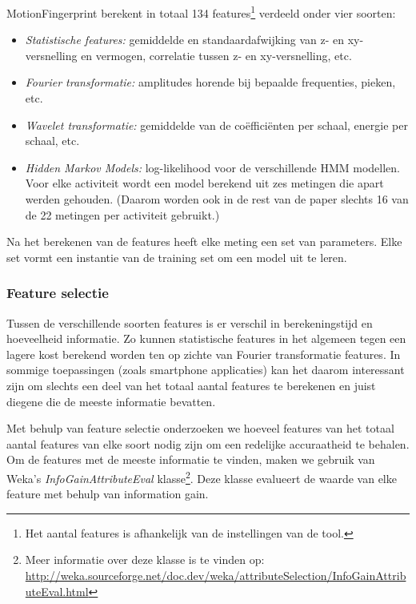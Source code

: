 \documentclass{article}
\begin{document}
MotionFingerprint berekent in totaal 134 features\footnote{Het aantal features is afhankelijk van de instellingen van de tool.} verdeeld onder vier soorten:
\begin{itemize}
\item \textit{Statistische features:} gemiddelde en standaardafwijking van z- en xy-versnelling en vermogen, correlatie tussen z- en xy-versnelling, etc. 
 
\item \textit{Fourier transformatie:} amplitudes horende bij bepaalde frequenties, pieken, etc.

\item \textit{Wavelet transformatie:} gemiddelde van de co\"effici\"enten per schaal, energie per schaal, etc.

\item \textit{Hidden Markov Models:} log-likelihood voor de verschillende HMM modellen. Voor elke activiteit wordt een model berekend uit zes metingen die apart werden gehouden. (Daarom worden ook in de rest van de paper slechts 16 van de 22 metingen per activiteit gebruikt.)
\end{itemize}


Na het berekenen van de features heeft elke meting een set van parameters. Elke set vormt een instantie van de training set om een model uit te leren.

\subsubsection{Feature selectie}
Tussen de verschillende soorten features is er verschil in berekeningstijd en hoeveelheid informatie. Zo kunnen statistische features in het algemeen tegen een lagere kost berekend worden ten op zichte van Fourier transformatie features. In sommige toepassingen (zoals smartphone applicaties) kan het daarom interessant zijn om slechts een deel van het totaal aantal features te berekenen en juist diegene die de meeste informatie bevatten.

Met behulp van feature selectie onderzoeken we hoeveel features van het totaal aantal features van elke soort nodig zijn om een redelijke accuraatheid te behalen. Om de features met de meeste informatie te vinden, maken we gebruik van Weka's \emph{InfoGainAttributeEval} klasse\footnote{Meer informatie over deze klasse is te vinden op: \url{http://weka.sourceforge.net/doc.dev/weka/attributeSelection/InfoGainAttributeEval.html}}.
Deze klasse evalueert de waarde van elke feature met behulp van information gain.
\end{document}
